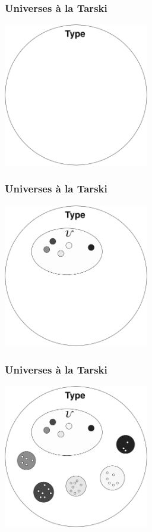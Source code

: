 \documentclass[12pt]{beamer}
\begin{document}
\begin{frame}
  \frametitle{Universes \`a la Tarski}
  \begin{center}
    \includegraphics[width=2.5in]{universe-empty.pdf}
  \end{center}
\end{frame}

\begin{frame}
  \frametitle{Universes \`a la Tarski}
  \begin{center}
    \includegraphics[width=2.5in]{universe-embedded.pdf}
  \end{center}
\end{frame}

\begin{frame}
  \frametitle{Universes \`a la Tarski}
  \begin{center}
    \includegraphics[width=2.5in]{universe-populated.pdf}
  \end{center}
\end{frame}
\end{document}
